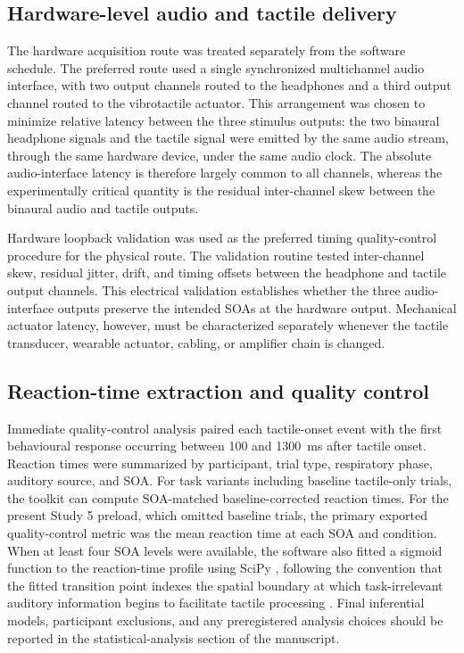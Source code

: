 \subsection{Hardware-level audio and tactile delivery}

The hardware acquisition route was treated separately from the software
schedule. The preferred route used a single synchronized multichannel audio
interface, with two output channels routed to the headphones and a third output
channel routed to the vibrotactile actuator. This arrangement was chosen to
minimize relative latency between the three stimulus outputs: the two binaural
headphone signals and the tactile signal were emitted by the same audio stream,
through the same hardware device, under the same audio clock. The absolute
audio-interface latency is therefore largely common to all channels, whereas
the experimentally critical quantity is the residual inter-channel skew between
the binaural audio and tactile outputs.

Hardware loopback validation was used as the preferred timing quality-control
procedure for the physical route. The validation routine tested inter-channel
skew, residual jitter, drift, and timing offsets between the headphone and
tactile output channels. This electrical validation establishes whether the
three audio-interface outputs preserve the intended SOAs at the hardware
output. Mechanical actuator latency, however, must be characterized separately
whenever the tactile transducer, wearable actuator, cabling, or amplifier chain
is changed.

\subsection{Reaction-time extraction and quality control}

Immediate quality-control analysis paired each tactile-onset event with the
first behavioural response occurring between 100 and 1300~ms after tactile
onset. Reaction times were summarized by participant, trial type, respiratory
phase, auditory source, and SOA. For task variants including baseline
tactile-only trials, the toolkit can compute SOA-matched baseline-corrected
reaction times. For the present Study 5 preload, which omitted baseline trials,
the primary exported quality-control metric was the mean reaction time at each
SOA and condition. When at least four SOA levels were available, the software
also fitted a sigmoid function to the reaction-time profile using SciPy
\citep{Virtanen2020SciPy}, following the convention that the fitted transition
point indexes the spatial boundary at which task-irrelevant auditory
information begins to facilitate tactile processing
\citep{Canzoneri2012DynamicSounds,Serino2015BodyPart}. Final inferential
models, participant exclusions, and any preregistered analysis choices should
be reported in the statistical-analysis section of the manuscript.
